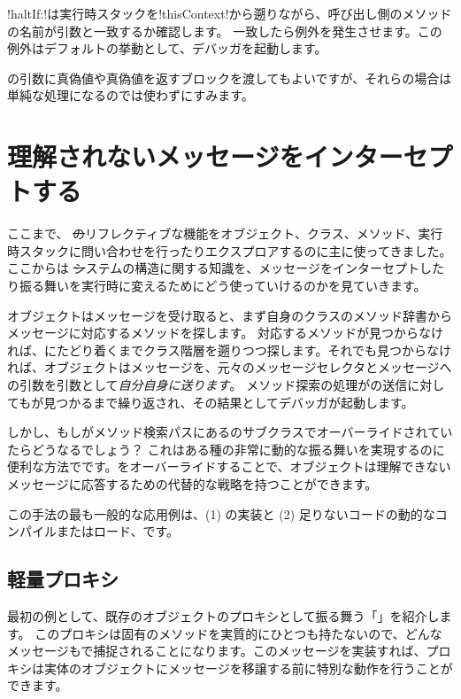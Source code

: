 \documentclass[a4paper,10pt,twoside]{book}
\begin{document}
\ct!haltIf:!は実行時スタックを\ct!thisContext!から遡りながら、呼び出し側のメソッドの名前が引数と一致するか確認します。
一致したら例外を発生させます。この例外はデフォルトの挙動として、デバッガを起動します。

の引数に真偽値や真偽値を返すブロックを渡してもよいですが、それらの場合は単純な処理になるのでは使わずにすみます。

\section{理解されないメッセージをインターセプトする}

ここまで、 \st のリフレクティブな機能をオブジェクト、クラス、メソッド、実行時スタックに問い合わせを行ったりエクスプロアするのに主に使ってきました。ここからは \st システムの構造に関する知識を、メッセージをインターセプトしたり振る舞いを実行時に変えるためにどう使っていけるのかを見ていきます。

オブジェクトはメッセージを受け取ると、まず自身のクラスのメソッド辞書からメッセージに対応するメソッドを探します。
対応するメソッドが見つからなければ、にたどり着くまでクラス階層を遡りつつ探します。それでも見つからなければ、オブジェクトはメッセージを、元々のメッセージセレクタとメッセージへの引数を引数として\emph{自分自身に送ります}。
メソッド探索の処理がの送信に対してもが見つかるまで繰り返され、その結果としてデバッガが起動します。

しかし、もしがメソッド検索パスにあるのサブクラスでオーバーライドされていたらどうなるでしょう？
これはある種の非常に動的な振る舞いを実現するのに便利な方法でです。をオーバーライドすることで、オブジェクトは理解できないメッセージに応答するための代替的な戦略を持つことができます。

この手法の最も一般的な応用例は、(1) の実装と (2) 足りないコードの動的なコンパイルまたはロード、です。

\subsection{軽量プロキシ}

最初の例として、既存のオブジェクトのプロキシとして振る舞う「」を紹介します。
このプロキシは固有のメソッドを実質的にひとつも持たないので、どんなメッセージもで捕捉されることになります。このメッセージを実装すれば、プロキシは実体のオブジェクトにメッセージを移譲する前に特別な動作を行うことができます。
\end{document}
